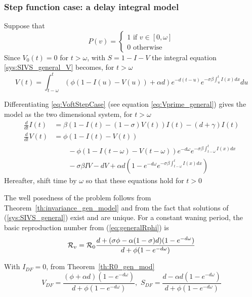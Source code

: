 \documentclass[aspectratio=169]{beamer}\usepackage[]{graphicx}\usepackage[]{xcolor}
\begin{document}
\begin{frame}\frametitle{Step function case: a delay integral model}
Suppose that
\[ 
P(v)=
\left\{
\begin{array}{l}
1\textrm{ if }v\in[0,\omega] \\
0\textrm{ otherwise} 
\end{array}
\right.
\]
Since $V_0(t)=0$ for $t>\omega$, with $S=1-I-V$ the
integral equation \eqref{sys:SIVS_general_V} becomes, for $t>\omega$
\begin{equation}
  V(t)=\int_{t-\omega}^t(\phi (1-I(u)-V(u))+\alpha d)e^{-d(t-u)}
  e^{-\sigma\beta\int_u^tI(x)dx}du
  \label{eq:VoftStepCase}
\end{equation}
\end{frame}

\begin{frame}
Differentiating \eqref{eq:VoftStepCase} (see equation
\eqref{eq:Vprime_general}) gives the model as the two
dimensional system, for $t>\omega$
\begin{subequations}\label{sys:SIVS_DDE}
\begin{align}
  \frac{d}{dt}I(t) &= 
  \beta(1-I(t)-(1-\sigma)V(t))I(t)-(d+\gamma)I(t) \label{sys:SIVS_DDE_dS} \\
  \frac{d}{dt}V(t) &=
  \phi(1-I(t)-V(t)) \label{sys:SIVS_DDE_dV}\\
  &\qquad-\phi(1-I(t-\omega)-V(t-\omega))e^{-d\omega}
  e^{-\sigma\beta\int_{t-\omega}^t I(x)dx} \nonumber \\
  &\qquad -\sigma\beta IV-dV
  +\alpha d\left(1-e^{-d\omega}e^{-\sigma\beta\int_{t-\omega}^t I(x)dx}
  \right) \nonumber
\end{align}
\end{subequations}
Hereafter, shift time by $\omega$ so that these equations hold for $t>0$
\end{frame}


\begin{frame}
The well posedness of the problem follows from
Theorem~\ref{th:invariance_gen_model} and from the fact that solutions
of (\ref{sys:SIVS_general}) exist and are unique.
For a constant waning period, the basic reproduction number from
(\ref{eq:generalRphi}) is
\begin{equation}
 \mathcal{R}_v = \mathcal{R}_0
 \frac{d+(\sigma\phi-\alpha(1-\sigma)d)
 (1-e^{-d\omega})}{d+\phi(1-e^{-d\omega})}
 \label{eq:Rphi}
\end{equation}


With $I_{DF}=0$, from Theorem~\ref{th:R0_gen_mod}
\begin{equation}
 V_{DF}=\frac{(\phi+\alpha d)(1-e^{-d\omega})}{d+\phi(1-e^{-d\omega})}
,\,\,
S_{DF}=\frac{d-\alpha d(1-e^{-d\omega})}{d+\phi(1-e^{-d\omega})}
 \label{eq:DFE_V}
\end{equation}
\end{frame}
\end{document}

